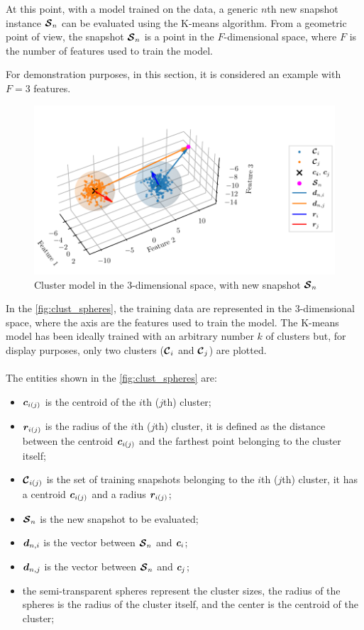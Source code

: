 At this point, with a model trained on the data, a generic $n$th new snapshot instance $\bm{\mathcal{S}}_n$ can be evaluated using the K-means algorithm.
From a geometric point of view, the snapshot $\bm{\mathcal{S}}_n$ is a point in the ${F}$-dimensional space, where ${F}$ is the number of features used to train the model.

For demonstration purposes, in this section, it is considered an example with ${F}=3$ features.

\begin{figure}[htbp]
  \centering
  \includegraphics[width=\textwidth]{images/Spheres_2.pdf}
\caption{Cluster model in the $3$-dimensional space, with new snapshot $\bm{\mathcal{S}}_n$}
\label{fig:clust_spheres}
\end{figure}

In the \autoref{fig:clust_spheres}, the training data are represented in the $3$-dimensional space, where the axis are the features used to train the model. The K-means model has been ideally trained with an arbitrary number $k$ of clusters but, for display purposes, only two clusters  ($\bm{\mathcal{C}}_i$ and $\bm{\mathcal{C}}_j$) are plotted. 
\paragraph*{}
The entities shown in the \autoref{fig:clust_spheres} are:
\begin{itemize}
  \item $\bm{c}_{i(j)}$ is the centroid of the $i$th ($j$th) cluster;
  \item $\bm{r}_{i(j)}$ is the radius of the $i$th ($j$th) cluster, it is defined as the distance between the centroid $\bm{c}_{i(j)}$ and the farthest point belonging to the cluster itself;
  \item $\bm{\mathcal{C}}_{i(j)}$ is the set of training snapshots belonging to the $i$th ($j$th) cluster, it has a centroid $\bm{c}_{i(j)}$ and a radius $\bm{r}_{i(j)}$;
  \item $\bm{\mathcal{S}}_n$ is the new snapshot to be evaluated;
  \item $\bm{d}_{n,i}$ is the vector between $\bm{\mathcal{S}}_n$ and $\bm{c}_i$;
  \item $\bm{d}_{n,j}$ is the vector between $\bm{\mathcal{S}}_n$ and $\bm{c}_j$;
  \item the semi-transparent spheres represent the cluster sizes, the radius of the spheres is the radius of the cluster itself, and the center is the centroid of the cluster;
\end{itemize}

